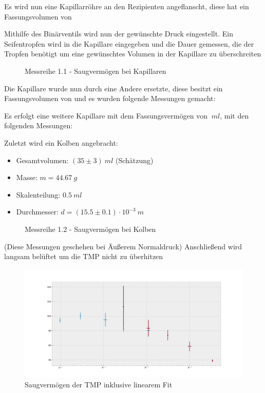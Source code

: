 \documentclass[12pt, a4paper]{scrartcl}
\begin{document}
    	Es wird nun eine Kapillarröhre an den Rezipienten angeflanscht, diese hat ein Fassungsvolumen von 
    
    	Mithilfe des Binärventils wird nun der gewünschte Druck eingestellt. Ein Seifentropfen wird in die Kapillare eingegeben und die Dauer gemessen, die der Tropfen benötigt um eine gewünschtes Volumen in der Kapillare zu überschreiten
    	
    	\begin{figure}[H]
    		\centering
    		
            \caption{Messreihe 1.1 - Saugvermögen bei Kapillaren}
    	\end{figure}
    	
    	Die Kapillare wurde nun durch eine Andere ersetzte, diese besitzt ein Fassungsvolumen von 
        und es wurden folgende Messungen gemacht:
    	
    	
    	Es erfolgt eine weitere Kapillare mit dem Fassungsvermögen von $\ ml$, mit den folgenden Messungen:
    	
    	
    	Zuletzt wird ein Kolben angebracht:
    	
    	\begin{itemize}
    		\item Gesamtvolumen: $(35\pm3)\ ml$ (Schätzung)
    		\item Masse: $m=44.67\ g$
    		\item Skalenteilung: $0.5\ ml$
    		\item Durchmesser: $d=(15.5\pm0.1)\cdot10^{-3}\ m$
    	\end{itemize}
    
    	\begin{figure}[H]
			\centering
            
			\caption{Messreihe 1.2 - Saugvermögen bei Kolben}
		\end{figure}
    	
    	(Diese Messungen geschehen bei Äußerem Normaldruck)
    	Anschließend wird langsam belüftet um die TMP nicht zu überhitzen
    	
    	
    	\begin{figure}[H]
    		\centering
    		\includegraphics[width=.6\paperwidth]{../24-f1}
    		\caption{Saugvermögen der TMP inklusive linearem Fit}
    	\end{figure}
    
\end{document}
